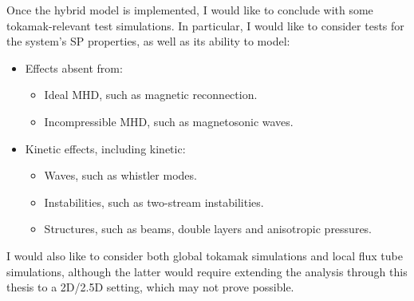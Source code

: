     \begin{remark}
        Once the hybrid model is implemented, I would like to conclude with some tokamak-relevant test simulations. In particular, I would like to consider tests for the system's SP properties, as well as its ability to model:
        \begin{itemize}
          \item  Effects absent from:
          \begin{itemize}
              \item  Ideal MHD, such as magnetic reconnection. \cite{Dungey_1961, Lockwood_2016}
              \item  Incompressible MHD, such as magnetosonic waves.
          \end{itemize}
            \item  Kinetic effects, including kinetic:
            \begin{itemize}
                \item  Waves, such as whistler modes. \cite{Chen_2015}
                \item  Instabilities, such as two-stream instabilities. \cite{ONeil_Malmberg_1968, Stix_1992}
                \item  Structures, such as beams, double layers and anisotropic pressures.
            \end{itemize}
        \end{itemize}
        I would also like to consider both global tokamak simulations and local flux tube simulations, although the latter would require extending the analysis through this thesis to a 2D/2.5D setting, which may not prove possible.
    \end{remark}
    